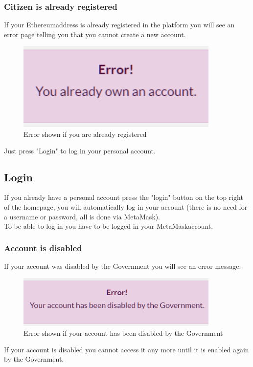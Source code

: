 		\subsubsection{Citizen is already registered}
		If your Ethereum\glosp address is already registered in the platform you will 
		see an error page telling you that you cannot create a new account.
		\begin{figure}[H]
			\includegraphics[width=10cm]{res/images/user_already_registered.png}
			\centering
			\caption{Error shown if you are already registered}
		\end{figure}
		\noindent Just press "Login" to log in your personal account.
	\subsection{Login}
	If you already have a personal account press the "login" button on the 
	top right of the homepage, you will automatically log in your account 
	(there is no need for a username or password, all is done via MetaMask). 
	\\To be able to log in you have to be logged in your MetaMask\glosp account.
		\subsubsection{Account is disabled}
		If your account was disabled by the Government you will see an error 
		message.
		\begin{figure}[H]
			\includegraphics[width=10cm]{res/images/user_disabled.png}
			\centering
			\caption{Error shown if your account has been disabled by the Government}
		\end{figure}
	\noindent If your account is disabled you cannot access it any more until it 
	is enabled again by the Government.

